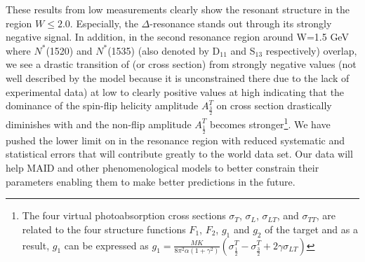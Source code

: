 These results from low \qsqs measurements clearly show the resonant structure in the region $W \le 2.0$. %
Especially, the $\Delta$-resonance stands out %
through its strongly negative signal. In addition, in the second resonance region around W=1.5 GeV where $N^*$(1520) and $N^*$(1535) (also denoted by D$_{11}$ and S$_{13}$ respectively) overlap, we see a drastic transition of \gones (or cross section) from strongly negative values (not well described by the model because it is unconstrained there due to the lack of experimental data) at low \qsqs to clearly positive values at high \qsqs indicating that the dominance of the spin-flip helicity amplitude $A^T_{\frac{3}{2}}$ on cross section drastically diminishes with \qsqs and the non-flip amplitude $A^T_{\frac{1}{2}}$ becomes stronger\footnote{The four virtual photoabsorption cross sections $\sigma_T$, $\sigma_L$, $\sigma_{LT}$, and $\sigma_{TT}$, are related to the four structure functions $F_1$, $F_2$, $g_1$ and $g_2$ of the target and as a result, $g_1$ can be expressed as $g_1 = \frac{ MK}{8 \pi ^2 \alpha (1 + \gamma^2)} (\sigma^T_{ \frac{1}{2} } - \sigma^T_{ \frac{3}{2} } + 2 \gamma \sigma_{LT})$}. %
We have pushed the lower limit on \qsqs %
in the resonance region with reduced systematic and statistical errors that will contribute greatly to the world data set. %
Our data will help MAID and other phenomenological models to better constrain %
their parameters enabling them to make better predictions in the future.

